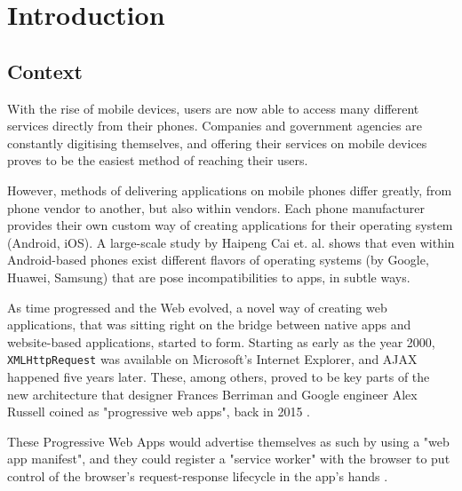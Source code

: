 \chapter{Introduction}


\section{Context}

With the rise of mobile devices, users are now able to access many different services directly from their phones. Companies and government agencies are constantly digitising themselves, and offering their services on mobile devices proves to be the easiest method of reaching their users.

However, methods of delivering applications on mobile phones differ greatly, from phone vendor to another, but also within vendors. Each phone manufacturer provides their own custom way of creating applications for their operating system (Android, iOS). A large-scale study by Haipeng Cai et. al. shows \cite{HaipengAndroidIncomp} that even within Android-based phones exist different flavors of operating systems (by Google, Huawei, Samsung) that are pose incompatibilities to apps, in subtle ways.

As time progressed and the Web evolved, a novel way of creating web applications, that was sitting right on the bridge between native apps and website-based applications, started to form. Starting as early as the year 2000, \verb|XMLHttpRequest| was available on Microsoft's Internet Explorer, and AJAX happened five years later. These, among others, proved to be key parts of the new architecture that designer Frances Berriman and Google engineer Alex Russell coined as "progressive web apps", back in 2015 \cite{PWAShortHist}.

These Progressive Web Apps would advertise themselves as such by using a "web app manifest", and they could register a "service worker" with the browser to put control of the browser's request-response lifecycle in the app's hands \cite{WHATWGWorkers}.

